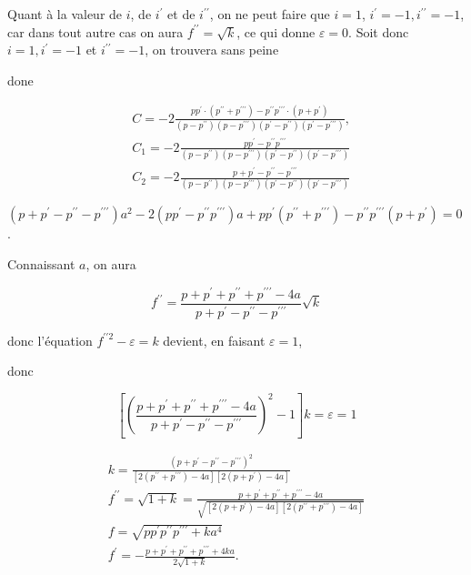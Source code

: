 \documentclass{article}
\begin{document}
Quant à la valeur de \(i\), de \(i^{\prime}\) et de \(i^{\prime \prime}\), on ne peut faire que \(i=1\), \(i^{\prime}=-1, i^{\prime \prime}=-1\), car dans tout autre cas on aura \(f^{\prime \prime}=\sqrt{k}\), ce qui donne \(\varepsilon=0\). Soit donc \(i=1, i^{\prime}=-1\) et \(i^{\prime \prime}=-1\), on trouvera sans peine

done

\[
\begin{aligned}
& C=-2 \frac{p p^{\prime} \cdot\left(p^{\prime \prime}+p^{\prime \prime \prime}\right)-p^{\prime \prime} p^{\prime \prime \prime} \cdot\left(p+p^{\prime}\right)}{\left(p-p^{\prime \prime}\right)\left(p-p^{\prime \prime \prime}\right)\left(p^{\prime}-p^{\prime \prime}\right)\left(p^{\prime}-p^{\prime \prime \prime}\right)}, \\
& C_{1}=-2 \frac{p p^{\prime}-p^{\prime \prime} p^{\prime \prime \prime}}{\left(p-p^{\prime \prime}\right)\left(p-p^{\prime \prime \prime}\right)\left(p^{\prime}-p^{\prime \prime}\right)\left(p^{\prime}-p^{\prime \prime \prime}\right)} \\
& C_{2}=-2 \frac{p+p^{\prime}-p^{\prime \prime}-p^{\prime \prime \prime}}{\left(p-p^{\prime \prime}\right)\left(p-p^{\prime \prime \prime}\right)\left(p^{\prime}-p^{\prime \prime}\right)\left(p^{\prime}-p^{\prime \prime \prime}\right)}
\end{aligned}
\]

\(\left(p+p^{\prime}-p^{\prime \prime}-p^{\prime \prime \prime}\right) a^{2}-2\left(p p^{\prime}-p^{\prime \prime} p^{\prime \prime \prime}\right) a+p p^{\prime}\left(p^{\prime \prime}+p^{\prime \prime \prime}\right)-p^{\prime \prime} p^{\prime \prime \prime}\left(p+p^{\prime}\right)=0\).

Connaissant \(a\), on aura

\[
f^{\prime \prime}=\frac{p+p^{\prime}+p^{\prime \prime}+p^{\prime \prime \prime}-4 a}{p+p^{\prime}-p^{\prime \prime}-p^{\prime \prime \prime}} \sqrt{k}
\]

donc l'équation \(f^{\prime \prime 2}-\varepsilon=k\) devient, en faisant \(\varepsilon=1\),

donc

\[
\left[\left(\frac{p+p^{\prime}+p^{\prime \prime}+p^{\prime \prime \prime}-4 a}{p+p^{\prime}-p^{\prime \prime}-p^{\prime \prime \prime}}\right)^{2}-1\right] k=\varepsilon=1
\]

\[
\begin{gathered}
k=\frac{\left(p+p^{\prime}-p^{\prime \prime}-p^{\prime \prime \prime}\right)^{2}}{\left[2\left(p^{\prime \prime}+p^{\prime \prime \prime}\right)-4 a\right]\left[2\left(p+p^{\prime}\right)-4 a\right]} \\
f^{\prime \prime}=\sqrt{1+k}=\frac{p+p^{\prime}+p^{\prime \prime}+p^{\prime \prime \prime}-4 a}{\sqrt{\left[2\left(p+p^{\prime}\right)-4 a\right]\left[2\left(p^{\prime \prime}+p^{\prime \prime \prime}\right)-4 a\right]}} \\
f=\sqrt{p p^{\prime} p^{\prime \prime} p^{\prime \prime \prime}+k a^{4}} \\
f^{\prime}=-\frac{p+p^{\prime}+p^{\prime \prime}+p^{\prime \prime \prime}+4 k a}{2 \sqrt{1+k}} .
\end{gathered}
\]
\end{document}

